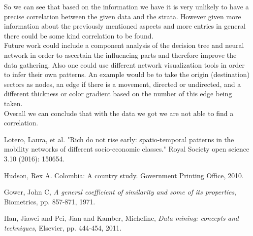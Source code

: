 \documentclass[runningheads]{llncs}
\begin{document}
	So we can see that based on the information we have it is very unlikely to have a precise correlation between the given data and the strata. However given more information about the previously mentioned aspects and more entries in general there could be some kind correlation to be found.\\
	Future work could include a component analysis of the decision tree and neural network in order to ascertain the influencing parts and therefore improve the data gathering. Also one could use different network visualization tools in order to infer their own patterns. An example would be to take the origin (destination) sectors as nodes, an edge if there is a movement, directed or undirected, and a different thickness or color gradient based on the number of this edge being taken.\\
	
	Overall we can conclude that with the data we got we are not able to find a correlation.
	
	
	\begin{thebibliography}{8}
		Lotero, Laura, et al. "Rich do not rise early: spatio-temporal patterns in the mobility networks of different socio-economic classes." Royal Society open science 3.10 (2016): 150654.
		
		Hudson, Rex A. Colombia: A country study. Government Printing Office, 2010.
		
		Gower, John C,
		\emph{A general coefficient of similarity and some of its properties},
		Biometrics, pp. 857-871,
		1971.
		
		Han, Jiawei and Pei, Jian and Kamber, Micheline,
		\emph{Data mining: concepts and techniques},
		Elsevier, pp. 444-454,
		2011.
	\end{thebibliography}
\end{document}

